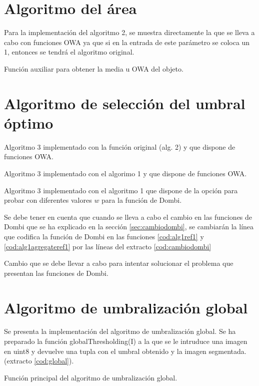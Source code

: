 \documentclass[main]{subfiles}
\begin{document}
\section{Algoritmo del área}
Para la implementación del algoritmo 2, se muestra directamente la que se lleva a cabo con funciones OWA ya que si en la entrada de este parámetro se coloca un 1, entonces se tendrá el algoritmo original.
\begin{listing}
    \caption{Función auxiliar para obtener la media u OWA del objeto.\label{cod:alg2}}
\end{listing}

\section{Algoritmo de selección del umbral óptimo}
\begin{listing}
    \caption{Algoritmo 3 implementado con la función original (alg. 2) y que dispone de funciones OWA.\label{cod:alg3a}}
\end{listing}
\begin{listing}
    \caption{Algoritmo 3 implementado con el algorimo 1 y que dispone de funciones OWA.\label{cod:alg3b}}
\end{listing}
\begin{listing}
    \caption{Algoritmo 3 implementado con el algoritmo 1 que dispone de la opción para probar con diferentes valores $w$ para la función de Dombi.\label{cod:alg3c}}
\end{listing}


Se debe tener en cuenta que cuando se lleva a cabo el cambio en las funciones de Dombi que se ha explicado en la sección \ref{sec:cambiodombi}, se cambiarán la línea que codifica la función de Dombi en las funciones \ref{cod:alg1ref1} y \ref{cod:alg1agregateref1} por las líneas del extracto \ref{cod:cambiodombi}
\begin{listing}
    \caption{Cambio que se debe llevar a cabo para intentar solucionar el problema que presentan las funciones de Dombi.\label{cod:cambiodombi}}
\end{listing}

\section{Algoritmo de umbralización global}
Se presenta la implementación del algoritmo de umbralización global. Se ha preparado la función {\ttfamily globalThresholding(I)} a la que se le intruduce una imagen en {\ttfamily uint8} y devuelve una tupla con el umbral obtenido y la imagen segmentada. (extracto \ref{cod:global}).
\begin{listing}
    \caption{Función principal del algoritmo de umbralización global.\label{cod:global}}
\end{listing}
\end{document}

